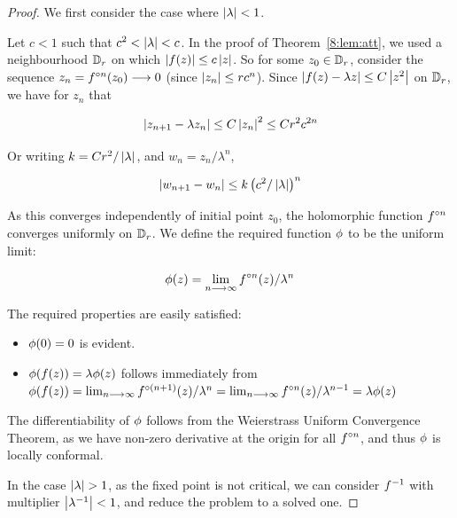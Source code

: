 \documentclass[../main.tex]{subfiles}
\begin{document}
\begin{proof}
    We first consider the case where $\left|\lambda\right|<1$. 
    
    Let $c<1$ such that $c^{2}<\left|\lambda\right|<c$. In the proof of Theorem~\ref{8:lem:att}, we used a neighbourhood $\mathbb{D}_{r}$ on which $\left|f(z)\right| \leq c\left|z\right|$. So for some $z_{0} \in \mathbb{D}_{r}$, consider the sequence $z_n=f^{\circ n}(z_0)\longrightarrow 0$ (since $\left|z_{n}\right| \leq r c^{n}$). Since $\left|f(z)-\lambda z\right| \leq C\left|z^{2}\right|$ on $\mathbb{D}_r$, we have for $z_n$ that
    
    \begin{equation*}
        \left|z_{n+1}-\lambda z_{n}\right| \leq C\left|z_{n}\right|^{2} \leq C r^{2} c^{2 n}
    \end{equation*}
    
    Or writing  $k=C r^{2} /\left|\lambda\right|$, and $w_{n}=z_{n} / \lambda^{n}$,
    
    \begin{equation*}
        \left|w_{n+1}-w_{n}\right| \leq k\left(c^{2}/\left|\lambda\right|\right)^{n}
    \end{equation*}
    
    As this converges independently of initial point $z_0$, the holomorphic function $f^{\circ n}$ converges uniformly on $\mathbb{D}_r$. We define the required function $\phi$ to be the uniform limit:
    
    \begin{equation*}
        \phi(z)=\lim _{n \longrightarrow \infty} f^{\circ n}(z) / \lambda^{n}
    \end{equation*}
    
    The required properties are easily satisfied:
    
    \begin{itemize}
        \item $\phi(0)=0$ is evident.
        \item $\phi(f(z))=\lambda \phi(z)$ follows immediately from $\phi(f(z))=\lim _{n \longrightarrow \infty} f^{\circ(n+1)}(z) / \lambda^{n}=\lim _{n \longrightarrow \infty} f^{\circ n}(z) / \lambda^{n-1}=\lambda \phi(z)$
    \end{itemize}
    
    The differentiability of $\phi$ follows from the Weierstrass Uniform Convergence Theorem, as we have non-zero derivative at the origin for all $f^{\circ n}$, and thus $\phi$ is locally conformal.
    
    In the case $\abs{\lambda}>1$, as the fixed point is not critical, we can consider $f^{-1}$ with multiplier $\left|\lambda^{-1}\right|<1$, and reduce the problem to a solved one.
    

\end{proof}
\end{document}
